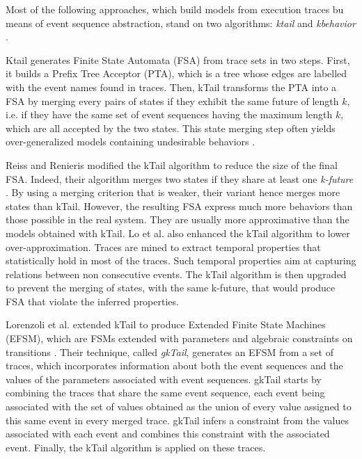 Most of the following approaches, which build models from execution traces bu means of event sequence abstraction, stand on two algorithms: \textit{ktail} \cite{5009015} and \textit{kbehavior} \cite{mariani2007dynamic}.

Ktail generates Finite State Automata (FSA) from trace sets in two steps. First, it builds a
Prefix Tree Acceptor (PTA), which is a tree whose edges are
labelled with the event names found in traces. Then, kTail transforms the PTA into a FSA by merging every pairs of states if they exhibit the same future of length $k$, i.e. if they have the same set of event sequences having the maximum length $k$, which are all accepted by the two states.
%
This state merging step often yields over-generalized models containing undesirable behaviors \cite{4023976}.

Reiss and Renieris modified the kTail algorithm to reduce the size of the final FSA.
Indeed, their algorithm merges two states if they
share at least one \textit{k-future} \cite{919096}. By using a
merging criterion that is weaker, their variant hence merges more states than kTail. However, the resulting FSA express much more behaviors than those possible in the real system. They are usually more approximative than the models obtained with kTail. Lo et al. \cite{Lo:2009:ASB:1595696.1595761} also enhanced the
kTail algorithm to lower over-approximation. Traces are mined to extract temporal properties that statistically hold in most of the traces. Such temporal properties aim at capturing relations between non consecutive events. The kTail algorithm is then upgraded to prevent the merging of states, with the same k-future, that would produce FSA that violate the inferred properties.

Lorenzoli et al. extended kTail to produce Extended Finite State Machines (EFSM), which are FSMs extended with parameters and algebraic constraints on transitions \cite{Lorenzoli2008}. Their technique, called \textit{gkTail},
generates an EFSM from a set of traces, which incorporates
information about both the event sequences and the values of the
parameters associated with event sequences. gkTail starts by combining the traces that share the same event sequence, each event being associated with the set of values obtained as the union of every value assigned to this same event in every merged trace. gkTail infers a constraint from the values associated with each event and combines this constraint with the associated event. Finally, the kTail algorithm is applied on these traces.

